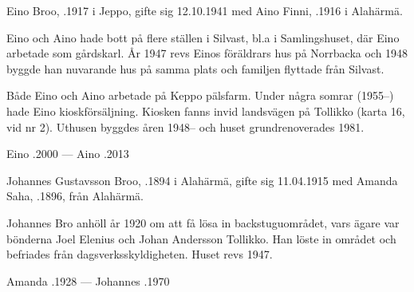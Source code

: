 Eino Broo, .1917 i Jeppo, gifte sig 12.10.1941 med Aino Finni, .1916 i Alahärmä.
\begin{jhchildren}
  \item {}
  \item {}
  \item {}
  \item {}
\end{jhchildren}
Eino och Aino hade bott på flere ställen i Silvast, bl.a i Samlingshuset, där Eino arbetade som gårdskarl. År 1947 revs Einos föräldrars hus på Norrbacka och 1948 byggde han nuvarande hus på samma plats och familjen flyttade från Silvast.

Både Eino och Aino arbetade på Keppo pälsfarm. Under några somrar (1955--) hade Eino kioskförsäljning. Kiosken fanns invid landsvägen på Tollikko (karta 16, vid nr 2). Uthusen byggdes åren 1948-- och huset grundrenoverades 1981.

Eino .2000  ---  Aino .2013




Johannes Gustavsson Broo, .1894 i Alahärmä, gifte sig 11.04.1915 med Amanda Saha, .1896, från Alahärmä.
\begin{jhchildren}
  \item {}
  \item {}
  \item {}
  \item {}
\end{jhchildren}

Johannes Bro anhöll år 1920 om att få lösa in backstuguområdet, vars ägare var bönderna Joel Elenius och Johan Andersson Tollikko. Han löste in området och befriades från dagsverksskyldigheten. Huset revs 1947.

Amanda .1928  ---  Johannes .1970


